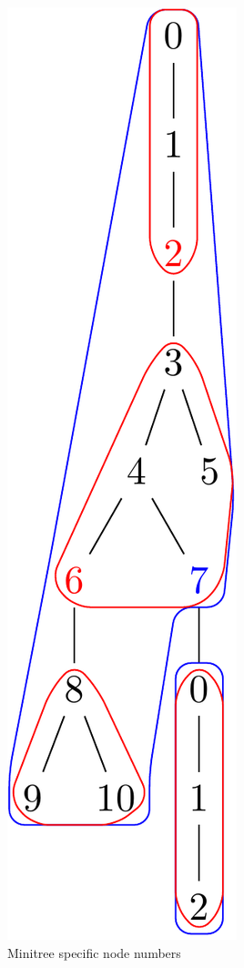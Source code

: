 \documentclass{article}
\begin{document}
\begin{figure}[ht]
\begin{subfigure}{2.5cm}
		\includegraphics[scale=0.2]{F3C4Tree}
		\caption{Minitree specific node numbers}
		\label{factory:subim4}
	\end{subfigure}
	\begin{subfigure}{2.5cm}

\end{subfigure}
\end{figure}
\end{document}

